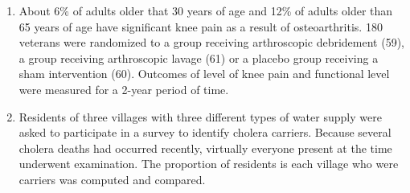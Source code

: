 \begin{enumerate}
\begin{MultipleChoice}
\end{MultipleChoice}

\item About 6\% of adults older that 30 years of age and 12\% of adults older than 65 years of age have significant knee pain as a result of osteoarthritis.  180 veterans were randomized to a group receiving arthroscopic debridement (59), a group receiving arthroscopic lavage (61) or a placebo group receiving a sham intervention (60). Outcomes of level of knee pain and functional level were measured for a 2-year period of time.

\begin{MultipleChoice}
\end{MultipleChoice}

\item Residents of three villages with three different types of water supply were asked to participate in a survey to identify cholera carriers.  Because several cholera deaths had occurred recently, virtually everyone present at the time underwent examination.  The proportion of residents is each village who were carriers was computed and compared.

\begin{MultipleChoice}
\end{MultipleChoice}
 
\end{enumerate}